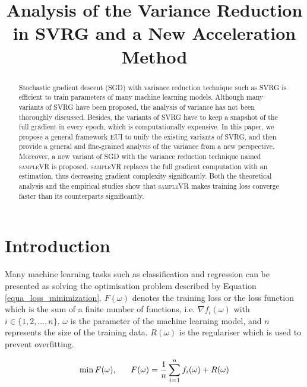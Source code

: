 \documentclass[letterpaper]{article}
\begin{document}
%
\title{Analysis of the Variance Reduction in SVRG and a New Acceleration Method}
\maketitle
\begin{abstract}
Stochastic gradient descent (SGD) with variance reduction  technique such as SVRG is efficient to train parameters of many machine learning models. Although many variants of SVRG have been proposed,  the analysis of variance has not been thoroughly discussed. Besides,  the variants of SVRG have to keep a snapshot of the full gradient in every epoch, which is computationally expensive. In this paper, we propose a general framework EUI  to unify the existing variants of SVRG, and then  provide a general and fine-grained analysis of the variance from a new perspective. Moreover,   a new variant of SGD with the variance reduction technique named \textsc{sampleVR} is proposed. \textsc{sampleVR} replaces the full gradient computation with an estimation, thus decreasing gradient complexity significantly.  Both the theoretical analysis and the empirical studies show that \textsc{sampleVR} makes  training loss converge faster than its counterparts significantly. 
\end{abstract}

\section{Introduction}
\label{sect_introduction}
Many machine learning tasks such as classification and regression  can be  presented as solving the optimisation problem described by Equation \ref{equa_loss_minimization}. $F(\omega)$ denotes the training loss or the loss function which is the sum of a finite number of functions, i.e. $\nabla f_i(\omega)$ with $i\in\{1,2, ..., n\}$. $\omega$ is the parameter of the machine learning model, and $n$ represents the size of the training data. $R(\omega)$ is the regulariser  which is used to prevent overfitting.    

\begin{equation}
\label{equa_loss_minimization}
\min F(\omega),~~~~~F(\omega)=\frac{1}{n}\sum\limits_{i=1}^n f_i(\omega)+R(\omega)\\
\end{equation}
\end{document}
